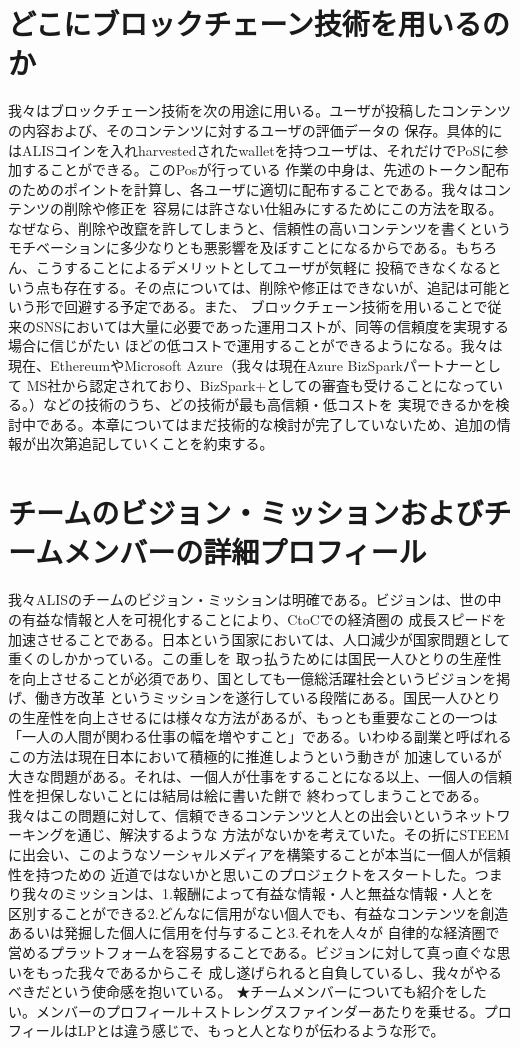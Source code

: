 \documentclass{jsarticle}
\begin{document}
\section{どこにブロックチェーン技術を用いるのか}
我々はブロックチェーン技術を次の用途に用いる。ユーザが投稿したコンテンツの内容および、そのコンテンツに対するユーザの評価データの
保存。具体的にはALISコインを入れharvestedされたwalletを持つユーザは、それだけでPoSに参加することができる。このPosが行っている
作業の中身は、先述のトークン配布のためのポイントを計算し、各ユーザに適切に配布することである。我々はコンテンツの削除や修正を
容易には許さない仕組みにするためにこの方法を取る。なぜなら、削除や改竄を許してしまうと、信頼性の高いコンテンツを書くという
モチベーションに多少なりとも悪影響を及ぼすことになるからである。もちろん、こうすることによるデメリットとしてユーザが気軽に
投稿できなくなるという点も存在する。その点については、削除や修正はできないが、追記は可能という形で回避する予定である。また、
ブロックチェーン技術を用いることで従来のSNSにおいては大量に必要であった運用コストが、同等の信頼度を実現する場合に信じがたい
ほどの低コストで運用することができるようになる。我々は現在、EthereumやMicrosoft Azure（我々は現在Azure BizSparkパートナーとして
MS社から認定されており、BizSpark+としての審査も受けることになっている。）などの技術のうち、どの技術が最も高信頼・低コストを
実現できるかを検討中である。本章についてはまだ技術的な検討が完了していないため、追加の情報が出次第追記していくことを約束する。
\section{チームのビジョン・ミッションおよびチームメンバーの詳細プロフィール}
我々ALISのチームのビジョン・ミッションは明確である。ビジョンは、世の中の有益な情報と人を可視化することにより、CtoCでの経済圏の
成長スピードを加速させることである。日本という国家においては、人口減少が国家問題として重くのしかかっている。この重しを
取っ払うためには国民一人ひとりの生産性を向上させることが必須であり、国としても一億総活躍社会というビジョンを掲げ、働き方改革
というミッションを遂行している段階にある。国民一人ひとりの生産性を向上させるには様々な方法があるが、もっとも重要なことの一つは
「一人の人間が関わる仕事の幅を増やすこと」である。いわゆる副業と呼ばれるこの方法は現在日本において積極的に推進しようという動きが
加速しているが大きな問題がある。それは、一個人が仕事をすることになる以上、一個人の信頼性を担保しないことには結局は絵に書いた餅で
終わってしまうことである。我々はこの問題に対して、信頼できるコンテンツと人との出会いというネットワーキングを通じ、解決するような
方法がないかを考えていた。その折にSTEEMに出会い、このようなソーシャルメディアを構築することが本当に一個人が信頼性を持つための
近道ではないかと思いこのプロジェクトをスタートした。つまり我々のミッションは、1.報酬によって有益な情報・人と無益な情報・人とを
区別することができる2.どんなに信用がない個人でも、有益なコンテンツを創造あるいは発掘した個人に信用を付与すること3.それを人々が
自律的な経済圏で営めるプラットフォームを容易することである。ビジョンに対して真っ直ぐな思いをもった我々であるからこそ
成し遂げられると自負しているし、我々がやるべきだという使命感を抱いている。
★チームメンバーについても紹介をしたい。メンバーのプロフィール＋ストレングスファインダーあたりを乗せる。プロフィールはLPとは違う感じで、もっと人となりが伝わるような形で。
\end{document}
